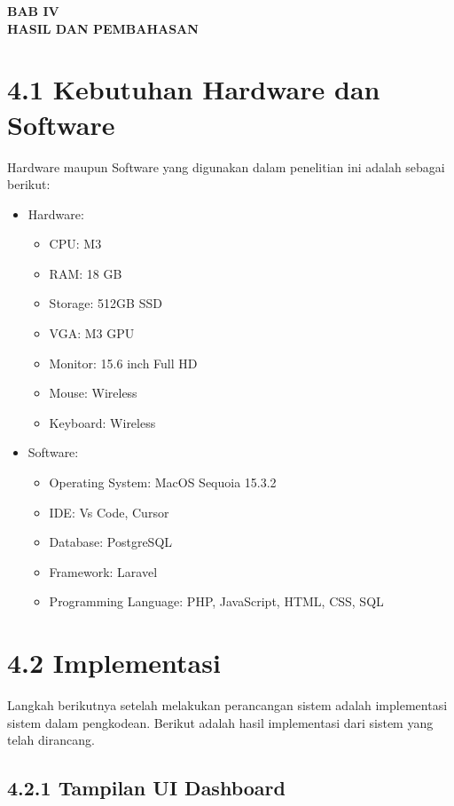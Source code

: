 \begin{center}
  \textbf{BAB IV} \\[0.5em]
  \textbf{HASIL DAN PEMBAHASAN}
\end{center}

\section*{4.1 Kebutuhan Hardware dan Software}
Hardware maupun Software yang digunakan dalam penelitian ini adalah sebagai berikut:

\begin{itemize}
  \item Hardware:
    \begin{itemize}
      \item CPU: M3
      \item RAM: 18 GB
      \item Storage: 512GB SSD
      \item VGA: M3 GPU
      \item Monitor: 15.6 inch Full HD
      \item Mouse: Wireless
      \item Keyboard: Wireless
    \end{itemize}
  \item Software:
    \begin{itemize}
      \item Operating System: MacOS Sequoia 15.3.2
      \item IDE: Vs Code, Cursor
      \item Database: PostgreSQL
      \item Framework: Laravel
      \item Programming Language: PHP, JavaScript, HTML, CSS, SQL
    \end{itemize}
\end{itemize}

\section*{4.2 Implementasi}

Langkah berikutnya setelah melakukan perancangan sistem adalah implementasi sistem dalam pengkodean. 
Berikut adalah hasil implementasi dari sistem yang telah dirancang.

\subsection*{4.2.1 Tampilan UI Dashboard}